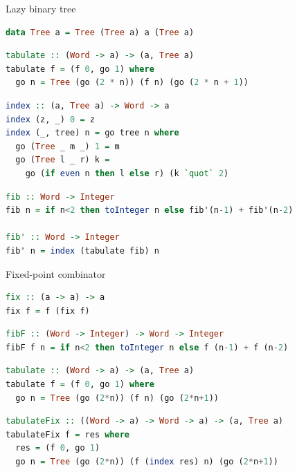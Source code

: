 \documentclass[handout]{beamer}
\begin{document}
\begin{frame}[fragile]{Lazy binary tree}

\begin{lstlisting}[language=Haskell]
data Tree a = Tree (Tree a) a (Tree a)
\end{lstlisting}

\begin{lstlisting}[language=Haskell]
tabulate :: (Word -> a) -> (a, Tree a)
tabulate f = (f 0, go 1) where
  go n = Tree (go (2 * n)) (f n) (go (2 * n + 1))
\end{lstlisting}

\begin{lstlisting}[language=Haskell]
index :: (a, Tree a) -> Word -> a
index (z, _) 0 = z
index (_, tree) n = go tree n where
  go (Tree _ m _) 1 = m
  go (Tree l _ r) k =
    go (if even n then l else r) (k `quot` 2)
\end{lstlisting}

\begin{lstlisting}[language=Haskell]
fib :: Word -> Integer
fib n = if n<2 then toInteger n else fib'(n-1) + fib'(n-2)

fib' :: Word -> Integer
fib' n = index (tabulate fib) n
\end{lstlisting}

\end{frame}

\begin{frame}[fragile]{Fixed-point combinator}

\begin{lstlisting}[language=Haskell]
fix :: (a -> a) -> a
fix f = f (fix f)
\end{lstlisting}

\begin{lstlisting}[language=Haskell]
fibF :: (Word -> Integer) -> Word -> Integer
fibF f n = if n<2 then toInteger n else f (n-1) + f (n-2)
\end{lstlisting}

\begin{lstlisting}[language=Haskell]
tabulate :: (Word -> a) -> (a, Tree a)
tabulate f = (f 0, go 1) where
  go n = Tree (go (2*n)) (f n) (go (2*n+1))
\end{lstlisting}

\begin{lstlisting}[language=Haskell]
tabulateFix :: ((Word -> a) -> Word -> a) -> (a, Tree a)
tabulateFix f = res where
  res = (f 0, go 1)
  go n = Tree (go (2*n)) (f (index res) n) (go (2*n+1))
\end{lstlisting}

\end{frame}
\end{document}
